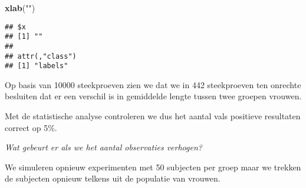 \documentclass[
  12pt,dutch,coursenotes]{book}
\newenvironment{Shaded}{\begin{snugshade}}{\end{snugshade}}
\newcommand{\KeywordTok}[1]{\textcolor[rgb]{0.13,0.29,0.53}{\textbf{#1}}}
\newcommand{\NormalTok}[1]{#1}
\newcommand{\StringTok}[1]{\textcolor[rgb]{0.31,0.60,0.02}{#1}}
\theoremstyle{definition}
\theoremstyle{definition}
\theoremstyle{definition}
\theoremstyle{remark}
\begin{document}
\begin{Shaded}
\begin{Highlighting}[]
\KeywordTok{xlab}\NormalTok{(}\StringTok{""}\NormalTok{)}
\end{Highlighting}
\end{Shaded}

\begin{verbatim}
## $x
## [1] ""
## 
## attr(,"class")
## [1] "labels"
\end{verbatim}

Op basis van 10000 steekproeven zien we dat we in 442 steekproeven ten onrechte besluiten dat er een verschil is in gemiddelde lengte tussen twee groepen vrouwen.

Met de statistische analyse controleren we dus het aantal vals positieve resultaten correct op 5\%.

\emph{Wat gebeurt er als we het aantal observaties verhogen?}

We simuleren opnieuw experimenten met 50 subjecten per groep maar we trekken de subjecten opnieuw telkens uit de populatie van vrouwen.
\end{document}
